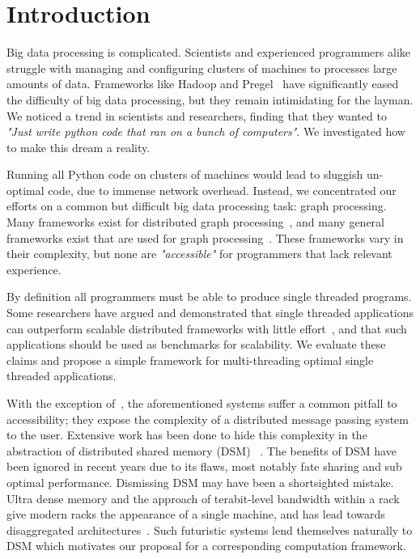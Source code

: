 \section{Introduction}
\label{sec:intro}

Big data processing is complicated. Scientists and experienced
programmers alike struggle with managing and configuring clusters of
machines to processes large amounts of data. Frameworks like Hadoop
and Pregel~\cite{Hadoop09,Malewicz:2010:PSL:1807167.1807184} have
significantly eased the difficulty of big data processing, but they
remain intimidating for the layman. We noticed a trend in scientists
and researchers, finding that they wanted to \textit{"Just write
python code that ran on a bunch of computers"}. We investigated how to
make this dream a reality.

Running all Python code on clusters of machines would lead to sluggish
un-optimal code, due to immense network overhead.  Instead, we
concentrated our efforts on a common but difficult big data processing
task: graph processing. Many frameworks exist for distributed graph
processing~\cite{Malewicz:2010:PSL:1807167.1807184,Ching:2015:OTE:2824032.2824077,Kyrola:2012:GLG:2387880.2387884,Low:2012:DGF:2212351.2212354,Xin:2013:GRD:2484425.2484427,Gonzalez:2012:PDG:2387880.2387883},
and many general frameworks exist that are used for graph
processing~\cite{Vavilapalli:2013:AHY:2523616.2523633,Zaharia:2012:RDD:2228298.2228301,Isard:2007:DDD:1272996.1273005,Murray:2013:NTD:2517349.2522738}.
These frameworks vary in their complexity, but none are
\textit{"accessible"} for programmers that lack relevant experience.

By definition all programmers must be able to produce single threaded
programs. Some researchers have argued and demonstrated that single
threaded applications can outperform scalable distributed frameworks
with little effort~\cite{189908}, and that such applications should be
used as benchmarks for scalability. We evaluate these claims and
propose a simple framework for multi-threading optimal single threaded
applications.

With the exception of~\cite{Kyrola:2012:GLG:2387880.2387884}, the
aforementioned systems suffer a common pitfall to accessibility; they
expose the complexity of a distributed message passing system to the
user. Extensive work has been done to hide this complexity in the
abstraction of distributed shared memory (DSM)
~\cite{Keleher:1994:TDS:1267074.1267084,Power:2010:PBF:1924943.1924964,Morin:2004:KDP:1111682.1111729,Haddad:2001:MCL:374794.374800,Huang06vodca:view-oriented}.
The benefits of DSM have been ignored in recent years due to its flaws,
most notably fate sharing and sub optimal performance. Dismissing DSM may 
have been a shortsighted mistake. Ultra dense memory and the
approach of terabit-level bandwidth within a rack give modern racks the
appearance of a single machine, and has lead towards disaggregated
architectures~\cite{facebook-rack,machine,intel-rsa,seamicro,Han:2013:NSR:2535771.2535778}.
Such futuristic systems lend themselves naturally to DSM which
motivates our proposal for a corresponding computation framework.

